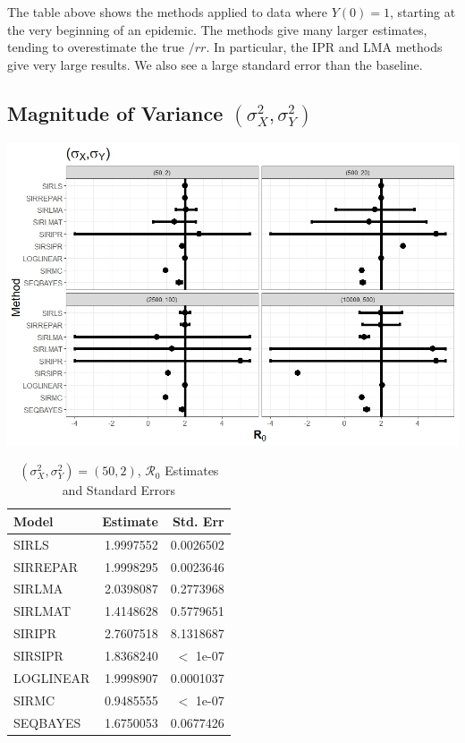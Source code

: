 \message{ !name(draft_v13.tex)}\documentclass[12pt]{article}
\newcommand{\rr}{\ensuremath{\mathcal{R}_0}}
\begin{document}
The table above shows the methods applied to data where $Y(0) = 1$, starting at the very beginning of an epidemic. The methods give many larger estimates, tending to overestimate the true $/rr$. In particular, the IPR and LMA methods give very large results. We also see a large standard error than the baseline.

\subsection{Magnitude of Variance $(\sigma^2_X, \sigma^2_Y)$}\label{sec:res-var}

\includegraphics[scale=0.5]{images/var.jpeg}

\begin{table}[H]
	
	\caption{\label{tab:} $(\sigma^2_X, \sigma^2_Y) = (50, 2)$, $\rr$ Estimates and Standard Errors}
	\centering
	\begin{tabular}[t]{l|r|r}
		\hline
		Model & Estimate & Std. Err\\
		\hline
		SIRLS & 1.9997552 & 0.0026502\\
		\hline
		SIRREPAR & 1.9998295 & 0.0023646\\
		\hline
		SIRLMA & 2.0398087 & 0.2773968\\
		\hline
		SIRLMAT & 1.4148628 & 0.5779651\\
		\hline
		SIRIPR & 2.7607518 & 8.1318687\\
		\hline
		SIRSIPR & 1.8368240 & $<$ 1e-07\\
		\hline
		LOGLINEAR & 1.9998907 & 0.0001037\\
		\hline
		SIRMC & 0.9485555 & $<$ 1e-07\\
		\hline
		SEQBAYES & 1.6750053 & 0.0677426\\
		\hline
	\end{tabular}
\end{table}
\end{document}
